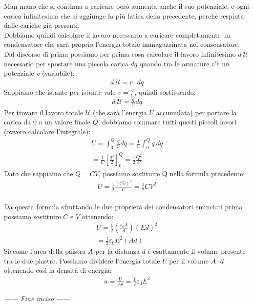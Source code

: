 \documentclass[a4paper, oneside]{article}
\begin{document}
\begin{aside}
    Man mano che si continua a caricare però aumenta anche il suo potenziale, e ogni carica infinitesima che si aggiunge fa più fatica della precedente, perchè respinta dalle cariche già presenti.\\
    Dobbiamo quindi calcolare il lavoro necessario a caricare completamente un condensatore che sarà proprio l'energia totale immagazzinata nel consensatore.\\
    Dal discorso di prima possiamo per prima cosa calcolare il lavoro infinitesimo $d\ \mathcal{U}$ necessario per spostare una piccola carica $dq$ quando 
    tra le armature c'è un potenziale $v$ (variabile):
    \begin{gather*}
        d\ \mathcal{U} = v \cdot dq
    \end{gather*}
    Sappiamo che istante per istante vale $v = \frac{q}{C}$, quindi sostituendo:
    \begin{gather*}
        d\ \mathcal{U} = \frac{q}{C} dq
    \end{gather*}
    Per trovare il lavoro totale $\mathcal{U}$ (che sarà l'energia $U$ accumulata) per portare la carica da $0$ a un valore finale $Q$, dobbiamo sommare tutti questi piccoli lavori (ovvero calcolare l'integrale):
    \begin{gather*}
        U = \int_0^Q \frac{q}{C} dq = \frac{1}{C} \int_0^Q q \ dq\\
        = \frac{1}{C} \left[ \frac{q^2}{2} \right]_0^Q = \frac{1}{2} \frac{Q^2}{C}
    \end{gather*}
    Dato che sappiamo che $Q=CV$, possiamo sostituire Q nella formula precedente:
    \begin{gather*}
        U = \frac{1}{2} \frac{(CV)^2}{C} = \frac{1}{2} C V^2
    \end{gather*}
    \hfill\\
    Da questa formula sfruttando le due proprietà dei condensatori enunciati prima possiamo sostituire $C$ e $V$ ottenendo:
    \begin{gather*}
        U = \frac{1}{2} \left(\frac{\varepsilon_0 A}{d}\right) (E d)^2 \\
        = \frac{1}{2} \varepsilon_0 E^2 (A d)
    \end{gather*} 
    Siccome l'area della paistra $A$ per la distanza $d$ è esattamente il volume presente tra le due piastre. 
    Possiamo dividere l'energia totale $U$ per il volume $A \cdot d$ ottenendo così la densità di energia:
    \begin{gather*}
        u = \frac{U}{Ad} = \frac{1}{2} \varepsilon_0 E^2
    \end{gather*}
    \begin{center}
        \textit{------ Fine inciso ------}
    \end{center}
\end{aside}\noindent
\end{document}
